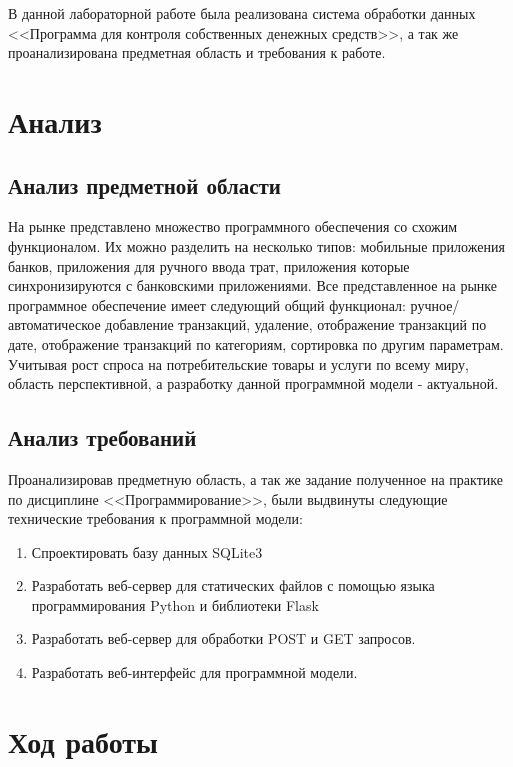 \documentclass[14pt]{extreport}
\begin{document}
\pagestyle{empty} %



\pagestyle{plain} %
\tableofcontents
\intro\label{intro} 

В данной лабораторной работе была реализована система обработки данных <<Программа для контроля собственных денежных средств>>, а так же проанализирована предметная область и требования к работе.

\chapter{Анализ}
\section{Анализ предметной области}

На рынке представлено множество программного обеспечения со схожим функционалом. Их можно разделить на несколько типов: мобильные приложения банков, приложения для ручного ввода трат, приложения которые синхронизируются с банковскими приложениями. Все представленное на рынке программное обеспечение имеет следующий общий функционал: ручное/автоматическое добавление транзакций, удаление, отображение транзакций по дате, отображение транзакций по категориям, сортировка по другим параметрам. Учитывая рост спроса на потребительские товары и услуги по всему миру, область перспективной, а разработку данной программной модели - актуальной.

\section{Анализ требований}

Проанализировав предметную область, а так же задание полученное на практике по дисциплине <<Программирование>>, были выдвинуты следующие технические требования к программной модели: 
\begin{enumerate}
    \item Спроектировать базу данных SQLite3
    \item Разработать веб-сервер для статических файлов с помощью языка программирования Python и библиотеки Flask
    \item Разработать веб-сервер для обработки POST и GET запросов.
    \item Разработать веб-интерфейс для программной модели.
\end{enumerate}

\chapter{Ход работы}
\end{document}
